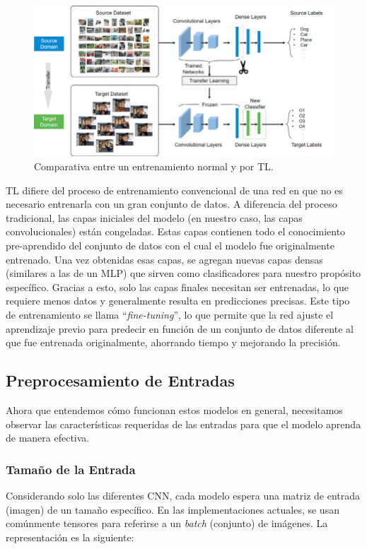 \begin{figure}[h!]
\includegraphics[width=1\textwidth]{images/transfer-learning.png}
\centering
\caption{Comparativa entre un entrenamiento normal y por TL\protect\cite{transfer-learning}.}
\label{transfer-learning}
\end{figure}
TL difiere del proceso de entrenamiento convencional de una 
red en que no es necesario entrenarla con un gran conjunto de 
datos. A diferencia del proceso tradicional, las capas iniciales 
del modelo (en nuestro caso, las capas convolucionales) están 
congeladas. Estas capas contienen todo el conocimiento pre-aprendido 
del conjunto de datos con el cual el modelo fue originalmente entrenado. 
Una vez obtenidas esas capas, se agregan nuevas capas densas (similares 
a las de un MLP) que sirven como clasificadores para nuestro propósito 
específico. Gracias a esto, solo las capas finales necesitan ser entrenadas, 
lo que requiere menos datos y generalmente resulta en predicciones precisas. 
Este tipo de entrenamiento se llama ``\textit{fine-tuning}'', lo que permite 
que la red ajuste el aprendizaje previo para predecir en función de un conjunto 
de datos diferente al que fue entrenada originalmente, ahorrando tiempo y 
mejorando la precisión.

\subsection{Preprocesamiento de Entradas}
Ahora que entendemos cómo funcionan estos modelos en general, 
necesitamos observar las características requeridas de las 
entradas para que el modelo aprenda de manera efectiva.

\subsubsection{Tamaño de la Entrada}
Considerando solo las diferentes CNN, cada modelo espera una 
matriz de entrada (imagen) de un tamaño específico. En las 
implementaciones actuales, se usan comúnmente tensores para 
referirse a un \textit{batch} (conjunto) de imágenes. La 
representación es la siguiente:

